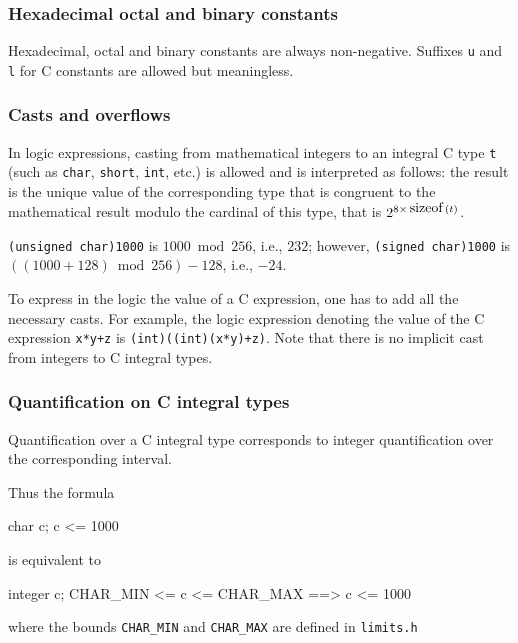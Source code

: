 \subsubsection{Hexadecimal octal and binary constants}

Hexadecimal, octal and binary constants are always non-negative. Suffixes
\texttt{u} and \texttt{l} for C constants are allowed but meaningless.

\subsubsection{Casts and  overflows}

In logic expressions, casting from mathematical integers
to an integral C type \lstinline|t| (such as \lstinline|char|,
\lstinline|short|, \lstinline|int|, etc.) is allowed and is
interpreted as follows: the result is the unique value of the
corresponding type that is congruent to the mathematical result modulo
the cardinal of this type, that is $2^{8\times\sizeof(t)}$.
\begin{example}
  \lstinline|(unsigned char)1000| is $1000 \bmod 256$, i.e., $232$;
  however, \lstinline|(signed char)1000| is $((1000+128) \bmod 256) - 128$, i.e., $-24$.
\end{example}

To express in the logic the value of a C
expression, one has to add all the necessary casts. For
example, the logic expression denoting the value of the C expression
\lstinline|x*y+z| is \lstinline|(int)((int)(x*y)+z)|.
Note that there is no implicit cast from integers to C integral types.



\subsubsection{Quantification on C integral types}
\label{sec:quantification}

Quantification over a C integral type corresponds to integer
quantification over the corresponding interval.
\begin{example}
Thus the formula
\begin{listing-nonumber}
\forall char c; c <= 1000
\end{listing-nonumber}
is equivalent to
\begin{listing-nonumber}
\forall integer c; CHAR_MIN <= c <= CHAR_MAX ==> c <= 1000
\end{listing-nonumber}
where the bounds \verb|CHAR_MIN| and \verb|CHAR_MAX| are defined
in \verb|limits.h|
\end{example}


